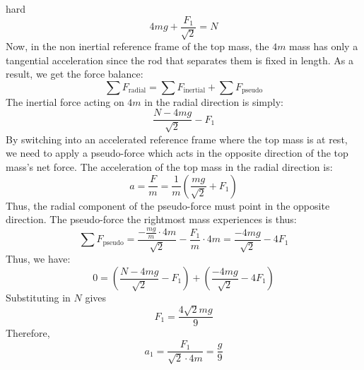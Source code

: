 \begin{solution}{hard}
$$4mg+\frac{F_1}{\sqrt2} = N$$
Now, in the non inertial reference frame of the top mass, the $4m$ mass has only a tangential acceleration since the rod that separates them is fixed in length. As a result, we get the force balance:
$$\sum F_\text{radial} = \sum F_\text{inertial} + \sum F_\text{pseudo}$$
The inertial force acting on $4m$ in the radial direction is simply:
$$\frac{N-4mg}{\sqrt{2}}-F_1$$
By switching into an accelerated reference frame where the top mass is at rest, we need to apply a pseudo-force which acts in the opposite direction of the top mass's net force. The acceleration of the top mass in the radial direction is:
$$a=\frac{F}{m}=\frac{1}{m}\left(\frac{mg}{\sqrt{2}}+F_1\right)$$
Thus, the radial component of the pseudo-force must point in the opposite direction. The pseudo-force the rightmost mass experiences is thus:
$$\sum F_\text{pseudo}= \frac{-\frac{mg}{m}\cdot 4m}{\sqrt2} -\frac{F_1}{m}\cdot 4m=\frac{-4mg}{\sqrt{2}}-4F_1$$
Thus, we have:
$$
0 = \left (\frac{N-4mg}{\sqrt2}-F_1  \right )+\left ( \frac{-4mg}{\sqrt{2}}-4F_1\right )
$$
Substituting in $N$ gives 
$$F_1=\frac{4\sqrt2 mg}{9}$$
Therefore,
$$a_1=\frac{F_1}{\sqrt2\cdot 4m}=\boxed{\frac{g}{9}}$$
\end{solution}
